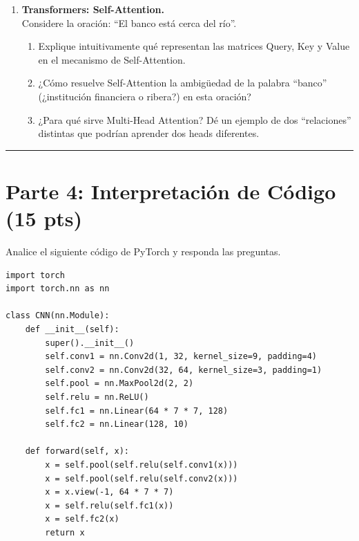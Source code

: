 \documentclass[12pt,a4paper]{article}
\begin{document}
\begin{enumerate}[label=\arabic*)]
    \item \textbf{Transformers: Self-Attention.} \\
    Considere la oración: ``El banco está cerca del río''.
    \begin{enumerate}[label=\alph*)]
        \item Explique intuitivamente qué representan las matrices Query, Key y Value en el mecanismo de Self-Attention.
        \item ¿Cómo resuelve Self-Attention la ambigüedad de la palabra ``banco'' (¿institución financiera o ribera?) en esta oración?
        \item ¿Para qué sirve Multi-Head Attention? Dé un ejemplo de dos ``relaciones'' distintas que podrían aprender dos heads diferentes.
    \end{enumerate}
\end{enumerate}

\vspace{0.5cm}
\hrule
\vspace{0.5cm}

\section*{Parte 4: Interpretación de Código (15 pts)}

Analice el siguiente código de PyTorch y responda las preguntas.

\begin{lstlisting}
import torch
import torch.nn as nn

class CNN(nn.Module):
    def __init__(self):
        super().__init__()
        self.conv1 = nn.Conv2d(1, 32, kernel_size=9, padding=4)
        self.conv2 = nn.Conv2d(32, 64, kernel_size=3, padding=1)
        self.pool = nn.MaxPool2d(2, 2)
        self.relu = nn.ReLU()
        self.fc1 = nn.Linear(64 * 7 * 7, 128)
        self.fc2 = nn.Linear(128, 10)

    def forward(self, x):
        x = self.pool(self.relu(self.conv1(x)))
        x = self.pool(self.relu(self.conv2(x)))
        x = x.view(-1, 64 * 7 * 7)
        x = self.relu(self.fc1(x))
        x = self.fc2(x)
        return x
\end{lstlisting}
\end{document}
